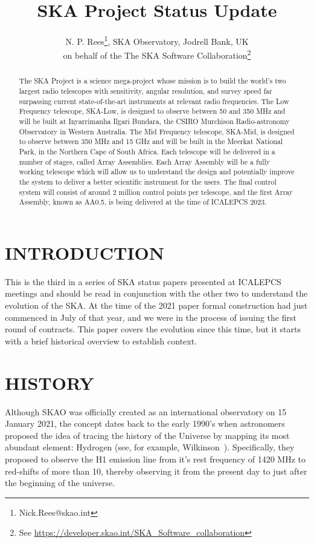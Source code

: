 \documentclass[a4paper,
               biblatex,     %
               keeplastbox,   %
               ]{jacow}
\begin{document}
\title{SKA Project Status Update}

\author{N. P. Rees\thanks{Nick.Rees@skao.int}, SKA Observatory, Jodrell Bank, UK\\
		on behalf of the The SKA Software Collaboration\footnote{See \url{https://developer.skao.int/SKA_Software_collaboration}}
		}
	
\maketitle

%
\begin{abstract}
The SKA Project is a science mega-project whose mission is to build the world's two largest radio telescopes with sensitivity, angular resolution, and survey speed far surpassing current state-of-the-art instruments at relevant radio frequencies. The Low Frequency telescope, SKA-Low, is designed to observe between 50 and 350 MHz and will be built at Inyarrimanha Ilgari Bundara, the CSIRO Murchison Radio-astronomy Observatory in Western Australia. The Mid Frequency telescope, SKA-Mid, is designed to observe between 350 MHz and 15 GHz and will be built in the Meerkat National Park, in the Northern Cape of South Africa. Each telescope will be delivered in a number of stages, called Array Assemblies. Each Array Assembly will be a fully working telescope which will allow us to understand the design and potentially improve the system to deliver a better scientific instrument for the users. The final control system will consist of around 2 million control points per telescope, and the first Array Assembly, known as AA0.5, is being delivered at the time of ICALEPCS 2023.
\end{abstract}

\section{INTRODUCTION}
This is the third in a series of SKA status papers presented at ICALEPCS meetings and should be read in conjunction with the other two to understand the evolution of the SKA. At the time of the 2021 paper formal construction had just commenced in July of that year, and we were in the process of issuing the first round of contracts. This paper covers the evolution since this time, but it starts with a brief historical overview to establish context.

\section{HISTORY}
Although SKAO was officially created as an international observatory on 15 January 2021, the concept dates back to the early 1990's when astronomers proposed the idea of tracing the history of the Universe by mapping its most abundant element: Hydrogen (see, for example, Wilkinson~\cite{1991ASPC...19..428W}). Specifically, they proposed to observe the H1 emission line from it's rest frequency of 1420 MHz to red-shifts of more than 10, thereby observing it from the present day to just after the beginning of the universe.
\end{document}
